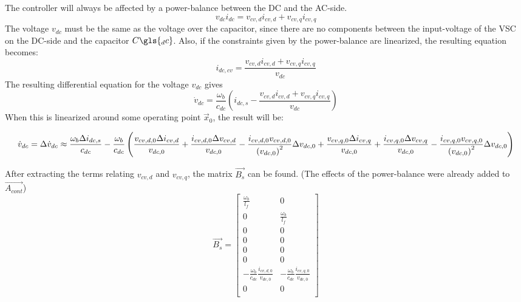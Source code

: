 The controller will always be affected by a power-balance between the DC and the AC-side.
\begin{equation}
 v_{dc} i_{dc} = v_{cv,d} i_{cv,d} + v_{cv,q}i_{cv,q}
\end{equation}{}
The voltage $v_{dc}$ must be the same as the voltage over the capacitor, since there are no components between the input-voltage of the \gls{VSC} on the DC-side and the capacitor $C\gls{_dc}$. Also, if the constraints given by the power-balance are linearized, the resulting equation becomes: 
\begin{equation}
 i_{dc,cv} = \frac{v_{cv,d}i_{cv,d} + v_{cv,q}i_{cv,q}}{v_{dc}}
\end{equation}{}
The resulting differential equation for the voltage $v_{dc}$ gives 
\begin{equation}
 \dot{v}_{dc} = \frac{\omega_b}{c_{dc}} \left( i_{dc,s} - \frac{v_{cv,d}i_{cv,d} + v_{cv,q}i_{cv,q} }{v_{dc}} \right) 
\end{equation}{}
When this is linearized around some operating point $\Vec{x}_0$, the result will be: 

\begin{dmath}
 \dot{v}_{dc} = \Delta \dot{v}_{dc} \approx \frac{\omega_b \Delta i_{dc,s}}{c_{dc}} - \frac{\omega_b}{c_{dc}}\left( \frac{v_{cv,d,0} \Delta i_{cv,d}}{v_{dc,0}} + \frac{i_{cv,d,0} \Delta v_{cv,d}}{v_{dc,0}} - \frac{i_{cv,d,0}v_{cv,d,0}}{\left(v_{dc,0}\right)^2}\Delta v_{dc,0}\\
 + \frac{v_{cv,q,0} \Delta i_{cv,q}}{v_{dc,0}} + \frac{i_{cv,q,0} \Delta v_{cv,q}}{v_{dc,0}} - \frac{i_{cv,q,0}v_{cv,q,0}}{\left(v_{dc,0}\right)^2}\Delta v_{dc,0}
 \right)
\end{dmath}{}





After extracting the terms relating $v_{cv,d}$ and $v_{cv,q}$, the matrix $\Vec{B_s}$ can be found. (The effects of the power-balance were already added to $\Vec{A_{cont}}$) 
\begin{equation}
 \Vec{B_s} = 
 \begin{bmatrix}
 \frac{\omega_b}{l_f} & 0\\
 0 & \frac{\omega_b}{l_f}\\
 0&0\\
 0&0\\
 0&0\\
 0&0\\
 -\frac{\omega_b}{c_{dc}}\frac{i_{cv,d,0}}{v_{dc,0}}&-\frac{\omega_b}{c_{dc}}\frac{i_{cv,q,0}}{v_{dc,0}}\\
 0&0\\
 \end{bmatrix}{}
\end{equation}{}

